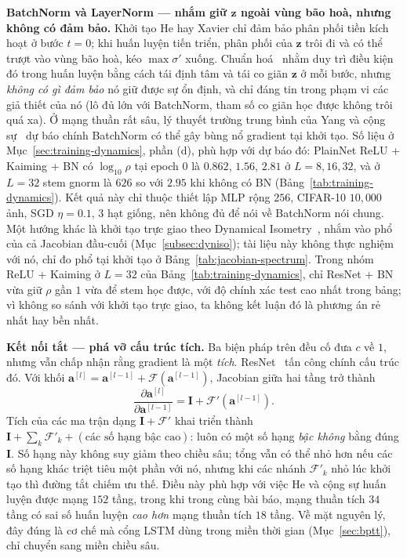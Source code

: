 \textbf{BatchNorm và LayerNorm --- nhắm giữ $\mathbf{z}$ ngoài vùng bão hoà, nhưng không có
đảm bảo.} Khởi tạo He hay Xavier chỉ đảm bảo phân phối tiền kích hoạt ở bước $t=0$; khi
huấn luyện tiến triển, phân phối của $\mathbf{z}$ trôi đi và có thể trượt vào vùng bão
hoà, kéo $\max\sigma'$ xuống. Chuẩn hoá~\cite{IoffeSzegedy2015} nhằm duy trì điều kiện đó
trong huấn luyện bằng cách tái định tâm và tái co giãn $\mathbf{z}$ ở mỗi bước, nhưng
\emph{không có gì đảm bảo} nó giữ được sự ổn định, và chỉ đáng tin trong phạm vi các
giả thiết của nó (lô đủ lớn với BatchNorm, tham số co giãn học được không trôi quá xa).
Ở mạng thuần rất sâu, lý thuyết trường trung bình của Yang và cộng sự~\cite{Yang2019MeanField}
dự báo chính BatchNorm có thể gây bùng nổ gradient tại khởi tạo. Số liệu ở
Mục~\ref{sec:training-dynamics}, phần (d), phù hợp với dự báo đó: PlainNet ReLU + Kaiming + BN có
$\log_{10}\rho$ tại epoch $0$ là $0.862$, $1.56$, $2.81$ ở $L=8,16,32$, và ở $L=32$ stem gnorm
là $626$ so với $2.95$ khi không có BN (Bảng~\ref{tab:training-dynamics}). Kết quả này chỉ
thuộc thiết lập MLP rộng $256$, CIFAR-10 $10{,}000$ ảnh, SGD $\eta=0.1$, $3$ hạt giống, nên không
đủ để nói về BatchNorm nói chung. Một hướng khác là khởi tạo trực giao theo
Dynamical Isometry~\cite{Xiao2018DynIso}, nhắm vào phổ của cả Jacobian đầu-cuối
(Mục~\ref{subsec:dyniso}); tài liệu này không thực nghiệm với nó, chỉ đo phổ tại khởi
tạo ở Bảng~\ref{tab:jacobian-spectrum}. Trong nhóm ReLU + Kaiming ở $L=32$ của
Bảng~\ref{tab:training-dynamics}, chỉ ResNet + BN vừa giữ $\rho$ gần $1$ vừa để stem học được,
với độ chính xác test cao nhất trong bảng; vì không so sánh với khởi tạo trực giao, ta không
kết luận đó là phương án rẻ nhất hay bền nhất.

\textbf{Kết nối tắt --- phá vỡ cấu trúc tích.} Ba biện pháp trên đều cố đưa $c$
về $1$, nhưng vẫn chấp nhận rằng gradient là một \emph{tích}. ResNet~\cite{He2016ResNet}
tấn công chính cấu trúc đó. Với khối $\mathbf{a}^{[l]} = \mathbf{a}^{[l-1]} +
\mathcal{F}(\mathbf{a}^{[l-1]})$, Jacobian giữa hai tầng trở thành
\[
  \frac{\partial\mathbf{a}^{[l]}}{\partial\mathbf{a}^{[l-1]}}
  = \mathbf{I} + \mathcal{F}'(\mathbf{a}^{[l-1]}).
\]
Tích của các ma trận dạng $\mathbf{I}+\mathcal{F}'$ khai triển thành
$\mathbf{I} + \sum_k \mathcal{F}'_k + (\text{các số hạng bậc cao})$: luôn có
một số hạng \emph{bậc không} bằng đúng $\mathbf{I}$. Số hạng này không suy giảm
theo chiều sâu; tổng vẫn có thể nhỏ hơn nếu các số hạng khác triệt tiêu một
phần với nó, nhưng khi các nhánh $\mathcal{F}'_k$ nhỏ lúc khởi tạo thì đường tắt
chiếm ưu thế. Điều này phù hợp với việc He và cộng sự huấn luyện được
mạng $152$ tầng, trong khi trong cùng bài báo, mạng thuần tích $34$ tầng có sai
số huấn luyện \emph{cao hơn} mạng thuần tích $18$ tầng. Về mặt nguyên lý, đây
đúng là cơ chế mà cổng LSTM dùng trong miền thời gian (Mục~\ref{sec:bptt}), chỉ
chuyển sang miền chiều sâu.


